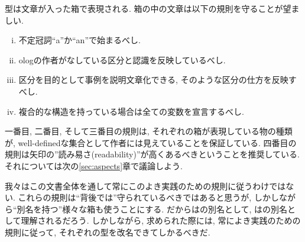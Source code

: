 \begin{rules}\label{rules:types}


型は文章が入った箱で表現される. 箱の中の文章は以下の規則を守ることが望ましい.
\begin{enumerate}[(i)]
\item 不定冠詞``a''か``an''で始まるべし.
\item ologの作者がなしている区分と認識を反映しているべし.
\item 区分を目的として事例を説明文章化できる, そのような区分の仕方を反映すべし.
\item 複合的な構造を持っている場合は全ての変数を宣言するべし.
\end{enumerate}

\end{rules}


一番目, 二番目, そして三番目の規則は, それぞれの箱が表現している物の種類が, well-definedな集合として作者には見えていることを保証している. 四番目の規則は矢印の''読み易さ(readability)''が高くあるべきということを推奨している. それについては次の\ref{sec:aspects}章で議論しよう.


我々はこの文書全体を通して常にこのよき実践のための規則に従うわけではない. これらの規則は``背後では''守られているべきではあると思うが, しかしながら``別名を持つ''様々な箱も使うことにする. だからはの別名として, はの別名として理解されるだろう. しかしながら, 求められた際には, 常によき実践のための規則に従って, それぞれの型を改名できてしかるべきだ.

